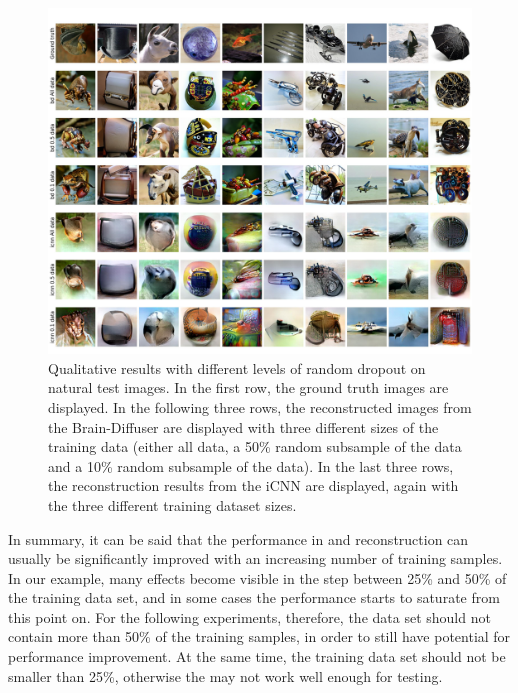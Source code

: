 \begin{figure}[H]
  \centering
  \includegraphics[width=1\textwidth]{plots/dropout_qual_random_test.JPEG}
  \caption[Qualitative results random dropout on natural test images]{Qualitative results with different levels of random dropout on natural test images. In the first row, the ground truth images are displayed. In the following three rows, the reconstructed images from the Brain-Diffuser are displayed with three different sizes of the training data (either all data, a 50\% random subsample of the data and a 10\% random subsample of the data). In the last three rows, the reconstruction results from the iCNN are displayed, again with the three different training dataset sizes.}\label{fig:dropout_qual_random_test}
\end{figure}

In summary, it can be said that the performance in  and reconstruction can usually be significantly improved with an increasing number of training samples. In our example, many effects become visible in the step between 25\% and 50\% of the training data set, and in some cases the performance starts to saturate from this point on. For the following experiments, therefore, the data set should not contain more than 50\% of the training samples, in order to still have potential for performance improvement. At the same time, the training data set should not be smaller than 25\%, otherwise the  may not work well enough for testing.


